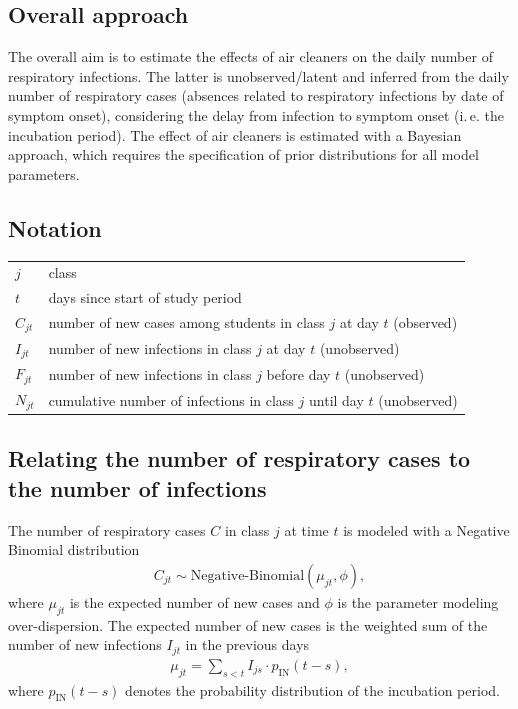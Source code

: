\documentclass[fleqn,11pt]{wlscirep_supp}
\newcommand\ie{i.\,e.\xspace}
\begin{document}
\subsection{Overall approach}

The overall aim is to estimate the effects of air cleaners on the daily number of respiratory infections. The latter is unobserved/latent and inferred from the daily number of respiratory cases (absences related to respiratory infections by date of symptom onset), considering the delay from infection to symptom onset (\ie the incubation period). The effect of air cleaners is estimated with a Bayesian approach, which requires the specification of prior distributions for all model parameters.


\subsection{Notation}

\begin{tabular}{ll} 
$j$  & class \\
$t$ & days since start of study period \\
$C_{jt}$  & number of  new cases among students in class $j$ at day $t$ (observed) \\
$I_{jt}$  & number of new infections in class $j$ at day $t$ (unobserved)  \\
$F_{jt}$  & number of new infections in class $j$ before day $t$ (unobserved)  \\
$N_{jt}$  & cumulative number of infections in class $j$ until day $t$ (unobserved)  \\
\end{tabular}  

\subsection{Relating the number of respiratory cases to the number of infections}

The number of respiratory cases $C$ in class $j$ at time $t$ is modeled with a Negative Binomial distribution   
\begin{align*}
    C_{jt} \sim \text{Negative-Binomial}(\mu_{jt},\phi),
\end{align*}
where $\mu_{jt}$ is the expected number of new cases and $\phi$ is the parameter modeling over-dispersion. The expected number of new cases is the weighted sum of the number of new infections $I_{jt}$ in the  previous days
\begin{align*}
    \mu_{jt} = \sum_{s<t}I_{js} \cdot p_{\text{IN}}(t-s),
\end{align*}
where $p_{\text{IN}}(t-s)$ denotes the probability distribution of the incubation period. 
\end{document}
